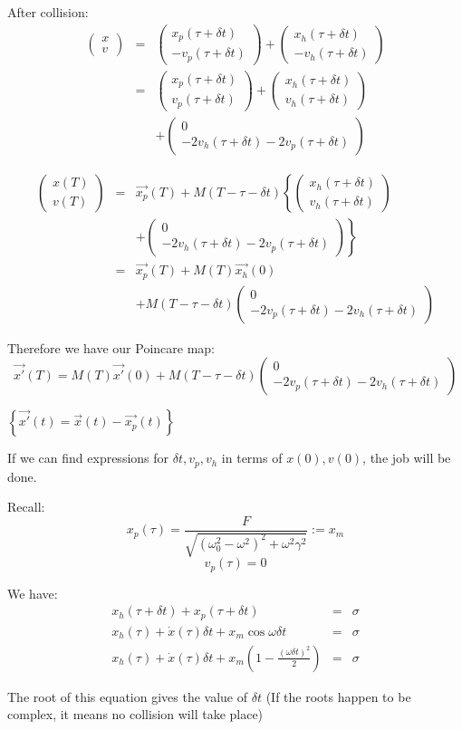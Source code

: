 \documentclass[xcolor=x11names,compress]{beamer}
\renewcommand{\(}{\begin{columns}}
\renewcommand{\)}{\end{columns}}
\newcommand{\<}[1]{\begin{column}{#1}}
\renewcommand{\>}{\end{column}}
\newcommand{\colv}[2]{\begin{pmatrix}#1\\#2\end{pmatrix}}
\begin{document}
\begin{frame}[label=BackFromM]
After collision:\\
\begin{eqnarray*}
\colv{x}{v}&=&\colv{x_p(\tau+\delta t)}{-v_p(\tau+\delta t)}+\colv{x_h(\tau+\delta t)}{-v_h(\tau+\delta t)}\\
&=&\colv{x_p(\tau+\delta t)}{v_p(\tau+\delta t)}+\colv{x_h(\tau+\delta t)}{v_h(\tau+\delta t)}\\
&&+\colv{0}{-2v_h(\tau+\delta t)-2v_p(\tau+\delta t)}
\end{eqnarray*}

\begin{eqnarray*}
\colv{x(T)}{v(T)}&=&\vec{x_p}(T)+M(T-\tau-\delta 
t)\left\{\colv{x_h(\tau+\delta t)}{v_h(\tau+\delta t)}\right.\\
&&\left.+\colv{0}{-2v_h(\tau+\delta t)-2v_p(\tau+\delta t)}\right\}\\
&=&\vec{x_p}(T)+M(T)\vec{x_h}(0)\\&&+M(T-\tau-\delta t)\colv{0}{-2v_p(\tau+\delta t)-2v_h(\tau+\delta t)}
\end{eqnarray*}
\hyperlink{homogen-evol}{}

\end{frame}

\begin{frame}
Therefore we have our Poincare map:
\begin{equation}
\label{poincare-hardcol}
\vec{x'}(T)=M(T)\vec{x'}(0)+M(T-\tau-\delta t)\colv{0}{-2v_p(\tau+\delta t)-2v_h(\tau+\delta t)}
\end{equation}

$\left\{\vec{x'}(t)=\vec{x}(t)-\vec{x_p}(t)\right\}$

If we can find expressions for $\delta t, v_p, v_h$ in terms of $x(0),v(0)$, 
the job will be done.  
\end{frame}

\begin{frame}
Recall:
\[
x_p(\tau)=\frac{F}{\sqrt{(\omega_0^2-\omega^2)^2+\omega^2\gamma^2}}:=x_m
\]
\[
v_p(\tau)=0
\]

We have:
\begin{eqnarray*}
x_h(\tau+\delta t)+x_p(\tau+\delta t)&=&\sigma\\
x_h(\tau)+\dot{x}(\tau)\delta t+x_m\cos{\omega \delta t}&=&\sigma\\
x_h(\tau)+\dot{x}(\tau)\delta t+x_m\left(1-\frac{(\omega \delta t)^2}{2}\right)&=&\sigma
\end{eqnarray*}

The root of this equation gives the value of $\delta t$
(If the roots happen to be complex, it means no collision will take place)
\end{frame}
\end{document}
